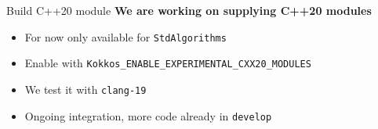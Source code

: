 \begin{frame}[fragile]{Build C++20 module}
  \centering
  \textbf{We are working on supplying C++20 modules} %
    \begin{itemize}
      \item For now only available for \texttt{StdAlgorithms}
      \item Enable with \texttt{Kokkos\_ENABLE\_EXPERIMENTAL\_CXX20\_MODULES}
      \item We test it with \texttt{clang-19}
      \item Ongoing integration, more code already in \texttt{develop}
    \end{itemize}
\end{frame}

